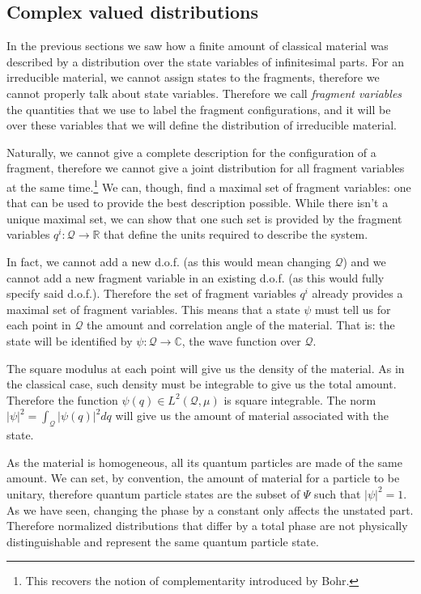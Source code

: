 \documentclass[smallextended]{svjour3}
\numberwithin{equation}{section}
\begin{document}
\subsection{Complex valued distributions}

In the previous sections we saw how a finite amount of classical material was described by a distribution over the state variables of infinitesimal parts. For an irreducible material, we cannot assign states to the fragments, therefore we cannot properly talk about state variables. Therefore we call \emph{fragment variables} the quantities that we use to label the fragment configurations, and it will be over these variables that we will define the distribution of irreducible material.

Naturally, we cannot give a complete description for the configuration of a fragment, therefore we cannot give a joint distribution for all fragment variables at the same time.\footnote{This recovers the notion of complementarity introduced by Bohr.} We can, though, find a maximal set of fragment variables: one that can be used to provide the best description possible. While there isn't a unique maximal set, we can show that one such set is provided by the fragment variables $q^i : \mathcal{Q} \rightarrow \mathbb{R}$ that define the units required to describe the system.

In fact, we cannot add a new d.o.f. (as this would mean changing $\mathcal{Q}$) and we cannot add a new fragment variable in an existing d.o.f. (as this would fully specify said d.o.f.). Therefore the set of fragment variables $q^i$ already provides a maximal set of fragment variables. This means that a state $\psi$ must tell us for each point in $\mathcal{Q}$ the amount and correlation angle of the material. That is: the state will be identified by $\psi : \mathcal{Q} \rightarrow \mathbb{C}$, the wave function over $\mathcal{Q}$.

The square modulus at each point will give us the density of the material. As in the classical case, such density must be integrable to give us the total amount. Therefore the function $\psi(q) \in L^2(\mathcal{Q}, \mu)$ is square integrable. The norm $|\psi|^2 = \int_{\mathcal{Q}} |\psi(q)|^2 dq$ will give us the amount of material associated with the state.

As the material is homogeneous, all its quantum particles are made of the same amount. We can set, by convention, the amount of material for a particle to be unitary, therefore quantum particle states are the subset of $\Psi$ such that $|\psi|^2 = 1$. As we have seen, changing the phase by a constant only affects the unstated part. Therefore normalized distributions that differ by a total phase are not physically distinguishable and represent the same quantum particle state.
\end{document}
